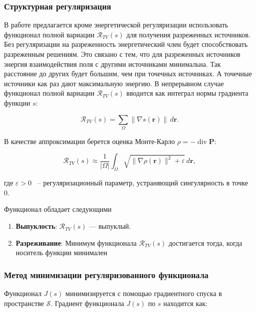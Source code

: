 \documentclass[a4paper,14pt,oneside,openany]{extarticle}
\begin{document}
\subsubsection{Структурная регуляризация}

В работе предлагается кроме энергетической регуляризации использовать функционал полной вариации 
$\mathcal{R}_{TV}(s)$
для получения разреженных источников. Без регуляризации на разреженность энергетический член 
будет способствовать разреженным решениям.
Это связано с тем, что для разреженных источников энергия взаимодействия поля с другими 
источниками минимальна. Так расстояние до
других будет большим, чем при точечных источниках. А точечные источники как раз дают 
максимальную энергию.
В непрерывном случае функционал полной вариации $\mathcal{R}_{TV}(s)$ вводится 
как интеграл нормы градиента функции $s$: 

\begin{equation}
    \mathcal{R}_{TV}(s) = \sum_{\Omega} \|\nabla s(\mathbf{r})\| \, d\mathbf{r}.
\end{equation}

В качестве аппроксимации берется оценка Монте-Карло $\rho = -\operatorname{div} \mathbf{P}$:

\begin{equation}
    \mathcal{R}_{TV}(s) \approx \frac{1}{|\Omega|} \int_{\Omega} \sqrt{\|\nabla \rho(\mathbf{r})\|^2 
    + \varepsilon} \, d\mathbf{r},
\end{equation}

где $\varepsilon > 0$ ~-- регуляризационный параметр, устраняющий сингулярность в точке 0.

Функционал обладает следующими
\begin{enumerate}
    \item \textbf{Выпуклость}: $\mathcal{R}_{TV}(s)$ --- выпуклый.
    \item \textbf{Разреживание}: Минимум функционала $\mathcal{R}_{TV}(s)$ достигается тогда, 
    когда носитель функции минимален
\end{enumerate}

\subsubsection{Метод минимизации регуляризованного функционала}

Функционал $J(s)$ минимизируется с помощью градиентного спуска в пространстве $\mathcal{S}$. 
Градиент функционала $J(s)$ по $s$ находится как:
\end{document}
